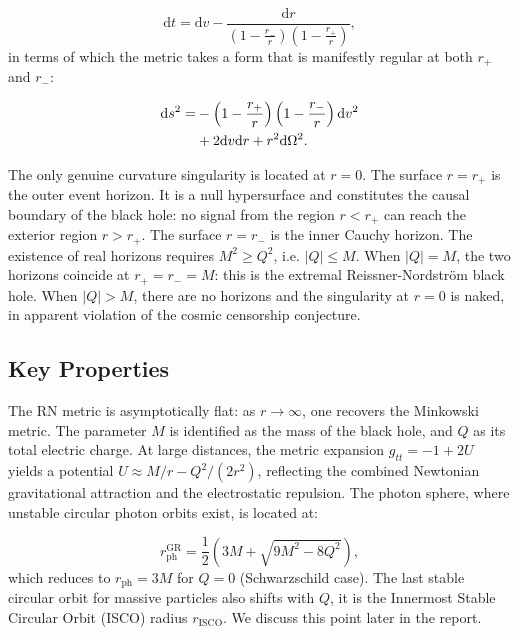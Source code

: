 \documentclass[floats,floatfix,aps, preprintnumbers,nofootinbib]{revtex4-2}
\newcommand{\paren}[1]{\left( #1 \right)}
\newcommand{\mrm}{\mathrm}
\begin{document}
\begin{equation}
    \mrm dt = \mrm dv - \frac{\mrm dr}{\paren{1 - \frac{r_-}{r}}\paren{1 - \frac{r_+}{r}}},
\end{equation}
in terms of which the metric takes a form that is manifestly regular at both $r_+$ and $r_-$:

\begin{align}\label{RNmetric_Eddington}
    \mrm ds^2 = &-\paren{1-\frac{r_+}{r}}\paren{1 - \frac{r_-}{r}}\mrm dv^2\notag\\
    &+ 2\mrm dv\mrm dr + r^2\mrm d\Omega^2.
\end{align}

The only genuine curvature singularity is located at $r = 0$. The surface $r = r_+$ is the outer event horizon. It is a null hypersurface and constitutes the causal boundary of the black hole: no signal from the region $r < r_+$ can reach the exterior region $r > r_+$. The surface $r = r_-$ is the inner Cauchy horizon. The existence of real horizons requires $M^2 \geq Q^2$, i.e. $|Q| \leq M$. When $|Q| = M$, the two horizons coincide at $r_+ = r_- = M$: this is the extremal Reissner-Nordström black hole. When $|Q| > M$, there are no horizons and the singularity at $r = 0$ is naked, in apparent violation of the cosmic censorship conjecture.

\subsection{Key Properties}

The RN metric is asymptotically flat: as $r \to \infty$, one recovers the Minkowski metric. The parameter $M$ is identified as the mass of the black hole, and $Q$ as its total electric charge. At large distances, the metric expansion $g_{tt} = -1+2U$ yields a potential $U \approx M/r - Q^2/(2r^2)$, reflecting the combined Newtonian gravitational attraction and the electrostatic repulsion. The photon sphere, where unstable circular photon orbits exist, is located at:

\begin{equation}\label{photonRN}
    r_{\mrm{ph}}^{\mrm{GR}} = \frac{1}{2}\left(3M + \sqrt{9M^2 - 8Q^2}\right),
\end{equation}
which reduces to $r_{\mrm{ph}} = 3M$ for $Q = 0$ (Schwarzschild case). The last stable circular orbit for massive particles also shifts with $Q$, it is the Innermost Stable Circular Orbit (ISCO) radius $r_\mrm{ISCO}$. We discuss this point later in the report.
\end{document}
